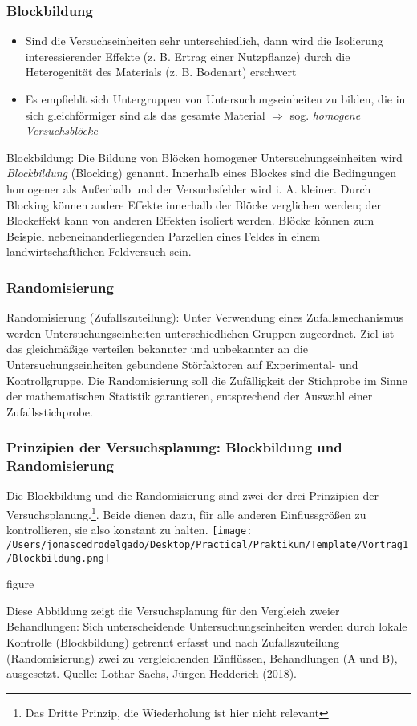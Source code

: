 \documentclass{beamer}
\begin{document}
\begin{frame}
\frametitle{Blockbildung}
\begin{itemize}
\item Sind die Versuchseinheiten sehr unterschiedlich, dann wird die Isolierung interessierender Effekte (z. B. Ertrag einer Nutzpflanze) durch die Heterogenität des Materials (z. B. Bodenart) erschwert
\item Es empfiehlt sich Untergruppen von Untersuchungseinheiten zu bilden, die in sich gleichförmiger sind als das gesamte Material $\Rightarrow$ sog. \textit{homogene Versuchsblöcke}
\end{itemize}
\begin{exampleblock}{Blockbildung:}
Die Bildung von Blöcken homogener Untersuchungseinheiten wird \textit{Blockbildung} (Blocking) genannt. Innerhalb eines Blockes sind die Bedingungen homogener als Außerhalb und der Versuchsfehler wird i. A. kleiner. Durch Blocking können andere Effekte innerhalb der Blöcke verglichen werden; der Blockeffekt kann von anderen Effekten isoliert werden. Blöcke können zum Beispiel nebeneinanderliegenden Parzellen eines Feldes in einem landwirtschaftlichen Feldversuch sein.
\end{exampleblock}
\end{frame}

\begin{frame}
\frametitle{Randomisierung}
\begin{exampleblock}{Randomisierung (Zufallszuteilung):}
Unter Verwendung eines Zufallsmechanismus werden Untersuchungseinheiten unterschiedlichen Gruppen zugeordnet. Ziel ist das gleichmäßige verteilen bekannter und unbekannter an die Untersuchungseinheiten gebundene Störfaktoren auf Experimental- und Kontrollgruppe. Die Randomisierung soll die Zufälligkeit der Stichprobe im Sinne der mathematischen Statistik garantieren, entsprechend der Auswahl einer Zufallsstichprobe.
\end{exampleblock}
\end{frame}

\begin{frame}
\frametitle{Prinzipien der Versuchsplanung: Blockbildung und Randomisierung}
Die Blockbildung und die Randomisierung sind zwei der drei Prinzipien der Versuchsplanung.\footnote{Das Dritte Prinzip, die Wiederholung ist hier nicht relevant}. Beide dienen dazu, für alle anderen Einflussgrößen zu kontrollieren, sie also konstant zu halten.
\texttt{[image: /Users/jonascedrodelgado/Desktop/Practical/Praktikum/Template/Vortrag1/Blockbildung.png]}
\caption{figure}{Diese Abbildung zeigt die Versuchsplanung für den Vergleich zweier Behandlungen: Sich unterscheidende Untersuchungseinheiten werden durch lokale Kontrolle (Blockbildung) getrennt erfasst und nach Zufallszuteilung (Randomisierung) zwei zu vergleichenden Einﬂüssen, Behandlungen (A und B), ausgesetzt. Quelle: Lothar Sachs, Jürgen Hedderich (2018).}
\end{frame}
\end{document}
